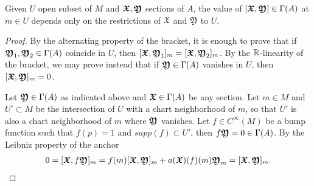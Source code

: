 



\begin{proposition}\label{bracketIsLocal}
Given $U$ open subset of $M$ and $\bm{\mathfrak{X}}, \bm{\mathfrak{Y}}$ sections of $A$, the value of $[\bm{\mathfrak{X}}, \bm{\mathfrak{Y}}] \in \Gamma(A)$ at $m \in U$ depends only on the restrictions of $\mathfrak{X}$ and $\mathfrak{Y}$ to $U$.
\end{proposition}
\begin{proof}
By the alternating property of the bracket, it is enough to prove that if $\bm{\mathfrak{Y}}_1, \bm{\mathfrak{Y}}_2 \in \Gamma(A)$ coincide in $U$, then $[\bm{\mathfrak{X}}, \bm{\mathfrak{Y}}_1]_m = [\bm{\mathfrak{X}}, \bm{\mathfrak{Y}}_2]_m$. By the $\mathbb{R}$-linearity of the bracket, we may prove instead that if $\bm{\mathfrak{Y}} \in \Gamma(A)$ vanishes in $U$, then $[\bm{\mathfrak{X}}, \bm{\mathfrak{Y}}]_m = 0$.

Let $\bm{\mathfrak{Y}} \in \Gamma(A)$ as indicated above and $\bm{\mathfrak{X}} \in \Gamma(A)$ be any section. Let $m \in M$ and $U' \subset M$ be the intersection of $U$ with a chart neighborhood of $m$, so that $U'$ is also a chart neighborhood of $m$ where $\bm{\mathfrak{Y}}$ vanishes. Let $f \in C^\infty(M)$ be a bump function such that $f(p) = 1$ and $supp(f) \subset U'$, then $f \bm{\mathfrak{Y}} = 0 \in \Gamma(A)$. By the Leibniz property of the anchor
\begin{align*}
    0 = [\bm{\mathfrak{X}}, f \bm{\mathfrak{Y}}]_m = f(m) [\bm{\mathfrak{X}}, \bm{\mathfrak{Y}}]_m + a(\bm{\mathfrak{X}})(f)(m) \bm{\mathfrak{Y}}_m = [\bm{\mathfrak{X}}, \bm{\mathfrak{Y}}]_m.
\end{align*}
\end{proof}

